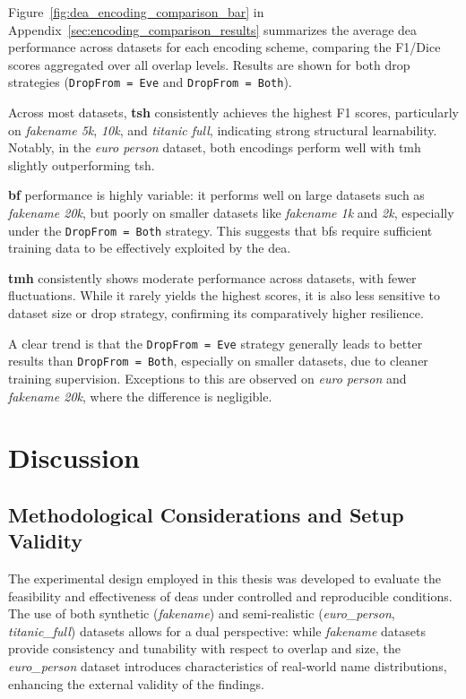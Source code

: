 Figure~\ref{fig:dea_encoding_comparison_bar} in Appendix~\ref{sec:encoding_comparison_results} summarizes the average \ac{dea} performance across datasets for each encoding scheme, comparing the F1/Dice scores aggregated over all overlap levels.
Results are shown for both drop strategies (\texttt{DropFrom = Eve} and \texttt{DropFrom = Both}).

Across most datasets, \textbf{\ac{tsh}} consistently achieves the highest F1 scores, particularly on \textit{fakename 5k}, \textit{10k}, and \textit{titanic full}, indicating strong structural learnability.
Notably, in the \textit{euro person} dataset, both encodings perform well with \ac{tmh} slightly outperforming \ac{tsh}.

\textbf{\ac{bf}} performance is highly variable: it performs well on large datasets such as \textit{fakename 20k}, but poorly on smaller datasets like \textit{fakename 1k} and \textit{2k}, especially under the \texttt{DropFrom = Both} strategy.
This suggests that \ac{bf}s require sufficient training data to be effectively exploited by the \ac{dea}.

\textbf{\ac{tmh}} consistently shows moderate performance across datasets, with fewer fluctuations.
While it rarely yields the highest scores, it is also less sensitive to dataset size or drop strategy, confirming its comparatively higher resilience.

A clear trend is that the \texttt{DropFrom = Eve} strategy generally leads to better results than \texttt{DropFrom = Both}, especially on smaller datasets, due to cleaner training supervision.
Exceptions to this are observed on \textit{euro person} and \textit{fakename 20k}, where the difference is negligible.


\section{Discussion}  \label{sec:discussion}


\subsection{Methodological Considerations and Setup Validity}

The experimental design employed in this thesis was developed to evaluate the feasibility and effectiveness of \ac{dea}s under controlled and reproducible conditions.
The use of both synthetic (\textit{fakename}) and semi-realistic (\textit{euro\_person}, \textit{titanic\_full}) datasets allows for a dual perspective: while \textit{fakename} datasets provide consistency and tunability with respect to overlap and size, the \textit{euro\_person} dataset introduces characteristics of real-world name distributions, enhancing the external validity of the findings.

